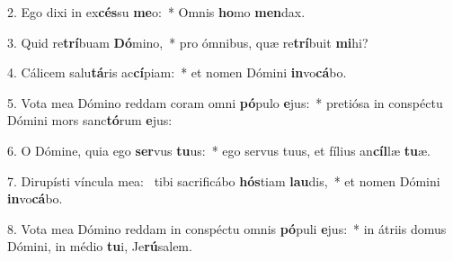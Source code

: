 2. Ego dixi in ex\textbf{cés}su \textbf{me}o:~*  Omnis \textbf{ho}mo \textbf{men}dax.\

3. Quid re\textbf{trí}buam \textbf{Dó}mino,~*  pro ómnibus, quæ re\textbf{trí}buit \textbf{mi}hi?\

4. Cálicem salu\textbf{tá}ris ac\textbf{cí}piam:~*  et nomen Dómini \textbf{in}vo\textbf{cá}bo.\

5. Vota mea Dómino reddam coram omni \textbf{pó}pulo \textbf{e}jus:~*  pretiósa in conspéctu Dómini mors sanc\textbf{tó}rum \textbf{e}jus:\

6. O Dómine, quia ego \textbf{ser}vus \textbf{tu}us:~*  ego servus tuus, et fílius an\textbf{cíl}læ \textbf{tu}æ.\

7. Dirupísti víncula mea: \dag\  tibi sacrificábo \textbf{hós}tiam \textbf{lau}dis,~*  et nomen Dómini \textbf{in}vo\textbf{cá}bo.\

8. Vota mea Dómino reddam in conspéctu omnis \textbf{pó}puli \textbf{e}jus:~*  in átriis domus Dómini, in médio \textbf{tu}i, Je\textbf{rú}salem.\

